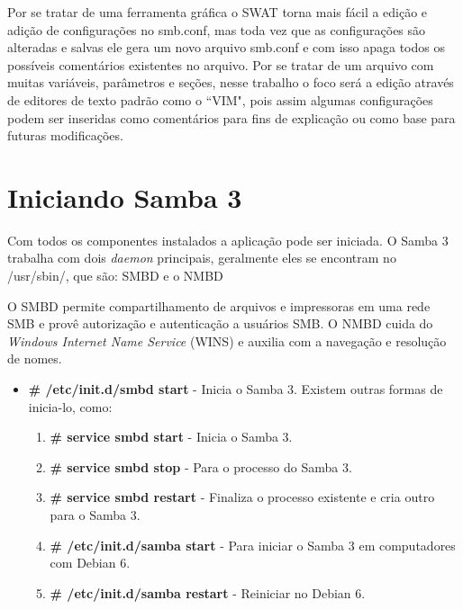 Por se tratar de uma ferramenta gráfica o SWAT torna mais fácil a edição e adição de configurações no smb.conf, mas toda vez que as configurações são alteradas e salvas ele gera um novo arquivo smb.conf e com isso apaga todos os possíveis comentários existentes no arquivo. Por se tratar de um arquivo com muitas variáveis, parâmetros e seções, nesse trabalho o foco será a edição através de editores de texto padrão como o ``VIM", pois assim algumas configurações podem ser inseridas como comentários para fins de explicação ou como base para futuras modificações.
 

\section{Iniciando Samba 3}

Com todos os componentes instalados a aplicação pode ser iniciada. O Samba 3 trabalha com dois \textit{daemon} principais, geralmente eles se encontram no /usr/sbin/,  que são: SMBD e o NMBD

O SMBD permite compartilhamento de arquivos e impressoras em uma rede SMB e provê autorização e autenticação a usuários SMB. O NMBD cuida do \textit{Windows Internet Name Service} (WINS) e auxilia com a navegação e resolução de nomes.\cite{SAMBA}

\begin{itemize}
	\item \textbf{\# /etc/init.d/smbd start} - Inicia o Samba 3. Existem outras formas de inicia-lo, como:
		\begin{enumerate}
			\item \textbf{\# service smbd start} - Inicia o Samba 3.
			\item \textbf{\# service smbd stop} - Para o processo do Samba 3.
			\item \textbf{\# service smbd restart} - Finaliza o processo existente e cria outro para o Samba 3.
			\item \textbf{\# /etc/init.d/samba start} - Para iniciar o Samba 3 em computadores com Debian 6.
			\item \textbf{\# /etc/init.d/samba restart} - Reiniciar no Debian 6.
		\end{enumerate}
\end{itemize}

